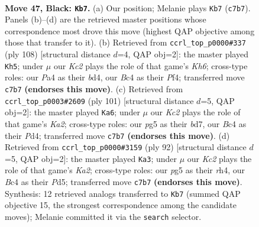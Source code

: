 \documentclass[11pt]{article}
\begin{document}
\clearpage

\begin{figure}[p]\centering
\begin{subfigure}{0.46\textwidth}\centering
\resizebox{\linewidth}{!}{%
\newchessgame
\chessboard[
  setfen={8/2k5/6p1/4K1P1/p1b5/8/8/6b1 b - - 1 47},
  showmover=false,
  pgfstyle=straightmove, color=movearrow, markmove={c7-b7}
]}
\caption{}
\end{subfigure}\hfill
\begin{subfigure}{0.46\textwidth}\centering
\resizebox{\linewidth}{!}{%
\newchessgame
\chessboard[
  setfen={8/5k2/3p3K/1B1P4/3b1P2/8/8/8 w - - 3 55},
  showmover=false,
  pgfstyle=straightmove, color=movearrow, markmove={h6-h5}
]}
\caption{}
\end{subfigure}
\\[4pt]
\begin{subfigure}{0.46\textwidth}\centering
\resizebox{\linewidth}{!}{%
\newchessgame
\chessboard[
  setfen={8/k2B4/3p4/8/3p4/8/5K2/3b4 b - - 9 51},
  showmover=false,
  pgfstyle=straightmove, color=movearrow, markmove={a7-a6}
]}
\caption{}
\end{subfigure}\hfill
\begin{subfigure}{0.46\textwidth}\centering
\resizebox{\linewidth}{!}{%
\newchessgame
\chessboard[
  setfen={1B6/8/8/3P1k2/7r/8/K1P5/8 w - - 10 47},
  showmover=false,
  pgfstyle=straightmove, color=movearrow, markmove={a2-a3}
]}
\caption{}
\end{subfigure}
\caption{\textbf{Move 47, Black: \texttt{Kb7}.} (a) Our position; Melanie plays \texttt{Kb7} (\texttt{c7b7}). Panels (b)--(d) are the retrieved master positions whose correspondence most drove this move (highest QAP objective among those that transfer to it). (b) Retrieved from \texttt{ccrl\_top\_p0000\#337} (ply 108) [structural distance $d$=4, QAP obj=2]: the master played \texttt{Kh5}; under $\mu$ our \emph{Kc2} plays the role of that game's \emph{Kh6}; cross-type roles: our \emph{P}a4 as their \emph{b}d4, our \emph{B}c4 as their \emph{P}f4; transferred move \texttt{c7b7} \textbf{(endorses this move)}. (c) Retrieved from \texttt{ccrl\_top\_p0003\#2609} (ply 101) [structural distance $d$=5, QAP obj=2]: the master played \texttt{Ka6}; under $\mu$ our \emph{Kc2} plays the role of that game's \emph{Ka2}; cross-type roles: our \emph{p}g5 as their \emph{b}d7, our \emph{B}c4 as their \emph{P}d4; transferred move \texttt{c7b7} \textbf{(endorses this move)}. (d) Retrieved from \texttt{ccrl\_top\_p0000\#3159} (ply 92) [structural distance $d$=5, QAP obj=2]: the master played \texttt{Ka3}; under $\mu$ our \emph{Kc2} plays the role of that game's \emph{Ka2}; cross-type roles: our \emph{p}g5 as their \emph{r}h4, our \emph{B}c4 as their \emph{P}d5; transferred move \texttt{c7b7} \textbf{(endorses this move)}. Synthesis: 12 retrieved analogs transferred to \texttt{Kb7} (summed QAP objective 15, the strongest correspondence among the candidate moves); Melanie committed it via the \texttt{search} selector.}
\label{fig:thought-m93}
\end{figure}
\end{document}
